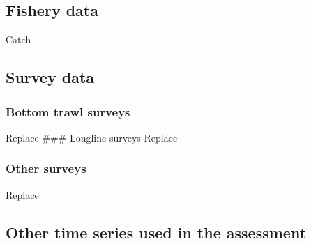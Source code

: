 \documentclass[11pt,
  english,
  a4paper,
]{article}
\begin{document}
\hypertarget{fishery-data}{%
\subsection{Fishery data}\label{fishery-data}}

\leavevmode\tagmcend\tagstructend


Catch

\leavevmode\tagmcend\tagstructend\par


\hypertarget{survey-data}{%
\subsection{Survey data}\label{survey-data}}

\leavevmode\tagmcend\tagstructend


\hypertarget{bottom-trawl-surveys}{%
\subsubsection{Bottom trawl surveys}\label{bottom-trawl-surveys}}

\leavevmode\tagmcend\tagstructend


Replace \#\#\# Longline surveys Replace

\leavevmode\tagmcend\tagstructend\par


\hypertarget{other-surveys}{%
\subsubsection{Other surveys}\label{other-surveys}}

\leavevmode\tagmcend\tagstructend


Replace

\leavevmode\tagmcend\tagstructend\par


\hypertarget{other-time-series-used-in-the-assessment}{%
\subsection{Other time series used in the assessment}\label{other-time-series-used-in-the-assessment}}
\end{document}
